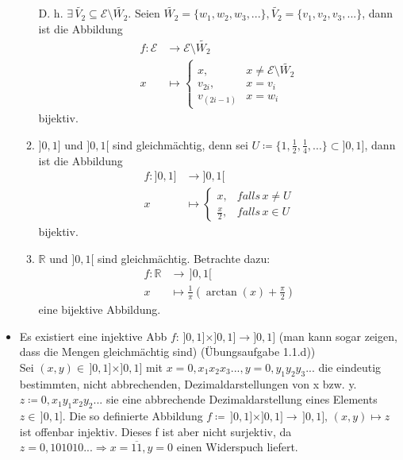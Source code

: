 \begin{itemize}[noitemsep]
\begin{enumerate}
	D. h. $\exists \, \widetilde{V_2} \subseteq \mathcal{E}\setminus\widetilde{W_2}$. Seien $\widetilde{W_2} = \{w_1, w_2, w_3, ...\}, \widetilde{V_2} = \{v_1, v_2, v_3,...\}$, dann ist die Abbildung
	\begin{equation*}
		\begin{aligned}
			f\colon \mathcal{E} & \to \mathcal{E}\setminus\widetilde{W_2}\\
			x & \mapsto
		\left\{
		\begin{matrix}
			x, & x \ne \mathcal{E}\setminus\widetilde{W_2}\\
			v_{2i}, & x = v_i\\
			v_{(2i-1)} & x = w_i
		\end{matrix}
		\right .
		\end{aligned}
	\end{equation*}
	\raggedleft
	bijektiv.
	\raggedright
	\item $]0,1]$ und $]0,1[$ sind gleichmächtig, denn sei $U\coloneqq \{1,\frac{1}{2}, \frac{1}{4}, ...\} \subset ]0,1]$, dann ist die Abbildung
	\begin{equation*}
		\begin{aligned}
		f\colon ]0,1] &\to ]0,1[\\
		x & \mapsto
		\left\{
		\begin{matrix}
			x, & falls \, x \ne U\\
			\frac{x}{2}, & falls \, x \in U
		\end{matrix}
		\right .
		\end{aligned}
	\end{equation*}
		\raggedleft
		bijektiv.
		\raggedright		
	\item $\mathbb{R}$ und $]0,1[$ sind gleichmächtig. Betrachte dazu:
	\begin{equation*}
		\begin{aligned}
		f\colon \mathbb{R} &\to \, ]0,1[\\
		x &\mapsto \frac{1}{\pi} (\arctan(x) + \frac{\pi}{2})
		\end{aligned}
	\end{equation*}
	\raggedleft
	eine bijektive Abbildung.
	\raggedright
\end{enumerate}
\item Es existiert eine injektive Abb $f\colon \, ]0,1]\times]0,1] \to ]0,1]$ (man kann sogar zeigen, dass die Mengen gleichmächtig sind) (Übungsaufgabe 1.1.d))\\
Sei $(x,y) \in \, ]0,1] \times ]0,1]$ mit $x = 0,x_1x_2x_3..., y= 0,y_1y_2y_3...$ die eindeutig bestimmten, nicht abbrechenden, Dezimaldarstellungen von x bzw. y. $z\coloneqq 0,x_1y_1x_2y_2...$ sie eine abbrechende Dezimaldarstellung eines Elements $z \in \, ]0,1]$. Die so definierte Abbildung $f\coloneqq \, ]0,1]\times]0,1] \to \, ]0,1], \, (x,y) \mapsto z$ ist offenbar injektiv. Dieses f ist aber nicht surjektiv, da $z = 0,101010... \Rightarrow x=\overline{11}, y = 0$ einen Widerspuch liefert.\\

\end{itemize}
